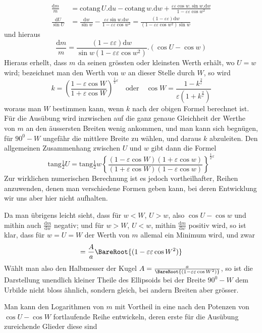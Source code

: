 %
\[
\begin{aligned}
\frac{\mathrm{d}m}{m}&=\mathrm{cotang}\,U\mathord{.}\mathrm{d}u-\mathrm{cotang}\,w\mathord{.}\mathrm{d}w+\frac{\varepsilon\varepsilon\cos w\mathord{.}\sin w\mathord{.}\mathrm{d}w}{1-\varepsilon\varepsilon\cos w^2}\\
\frac{\mathrm{d}U}{\sin U}&=\frac{\mathrm{d}w}{\sin w}-\frac{\varepsilon\varepsilon\sin w\mathord{.}\mathrm{d}w}{1-\varepsilon\varepsilon\cos w^2}=\frac{(1-\varepsilon\varepsilon)\mathrm{d}w}{(1-\varepsilon\varepsilon\cos w^2)\sin w}
\end{aligned}
\]
\noindent und hieraus
\[
\frac{\mathrm{d}m}{m}=\frac{(1-\varepsilon\varepsilon)\mathrm{d}w}{\sin w(1-\varepsilon\varepsilon\cos w^2)}\mathord{.}(\cos U-\cos w)
\]
\noindent Hieraus erhellt, dass \(m\) da seinen grössten oder kleinsten Werth erhält, wo \(U=w\) wird; bezeichnet man den Werth von \(w\) an dieser Stelle durch \(W\), so wird
\[
k=(\frac{1-\varepsilon\cos W}{1+\varepsilon\cos W})^{\frac{1}{2}\varepsilon}\quad\text{oder}\quad \cos W=\frac{1-k^{\frac{2}{\varepsilon}}}{\varepsilon(1+k^{\frac{2}{\varepsilon}})}
\]
\noindent woraus man \(W\) bestimmen kann, wenn \(k\) nach der obigen Formel berechnet ist. Für die Ausübung wird inzwischen auf die ganz genaue Gleichheit der Werthe von \(m\) an den äussersten Breiten wenig ankommen, und man kann sich begnügen, für \(90^0-W\) ungefähr die mittlere Breite zu wählen, und daraus \(k\) abzuleiten. Den allgemeinen Zusammenhang zwischen \(U\) und \(w\) gibt dann die Formel
\[
\mathrm{tang}\tfrac{1}{2}U=\mathrm{tang}\tfrac{1}{2}w\left\{\frac{(1-\varepsilon\cos W)(1+\varepsilon\cos w)}{(1+\varepsilon\cos W)(1-\varepsilon\cos w)}\right\}^{\frac{1}{2}\varepsilon}
\]
\noindent Zur wirklichen numerischen Berechnung ist es jedoch vortheilhafter, Reihen anzuwenden, denen man verschiedene Formen geben kann, bei deren Entwicklung wir uns aber hier nicht aufhalten.

Da man übrigens leicht sieht, dass für \(w<W\), \(U>w\), also \(\cos U-\cos w\) und mithin auch \(\frac{\mathrm{d}m}{\mathrm{d}w}\) negativ; und für \(w>W\), \(U<w\), mithin \(\frac{\mathrm{d}m}{\mathrm{d}w}\) positiv wird, so ist klar, dass für \(w=U=W\) der Werth von \(m\) allemal ein Minimum wird, und zwar
\[
=\frac{A}{a}\BareRoot{(1-\varepsilon\varepsilon\cos W^2)}
\]
\noindent Wählt man also den Halbmesser der Kugel \(A=\frac{a}{\BareRoot{(1-\varepsilon\varepsilon\cos W^2)}}\), so ist die Darstellung unendlich kleiner Theile des Ellipsoids bei der Breite \(90^0-W\) dem Urbilde nicht bloss ähnlich, sondern gleich, bei andern Breiten aber grösser.

Man kann den Logarithmen von \(m\) mit Vortheil in eine nach den Potenzen von \(\cos U-\cos W\) fortlaufende Reihe entwickeln, deren erste für die Ausübung zureichende Glieder diese sind
